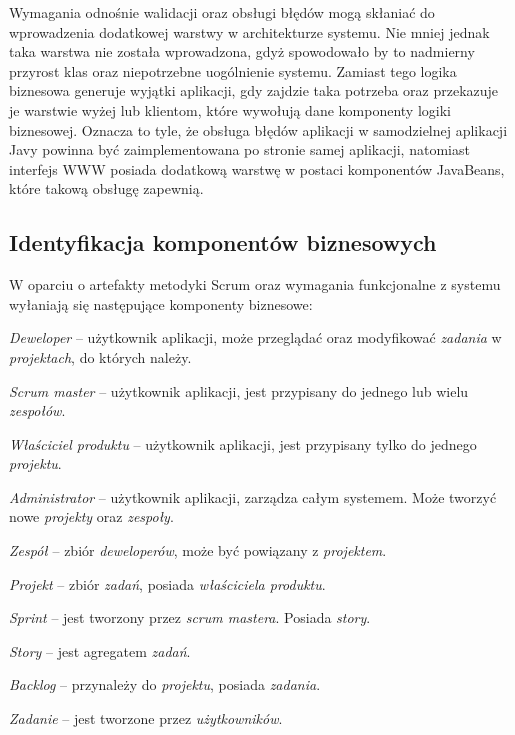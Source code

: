 Wymagania odnośnie walidacji oraz obsługi błędów mogą skłaniać do wprowadzenia dodatkowej warstwy w architekturze systemu. Nie mniej jednak taka warstwa nie została wprowadzona, gdyż spowodowało by to nadmierny przyrost klas oraz niepotrzebne uogólnienie systemu. Zamiast tego logika biznesowa generuje wyjątki aplikacji, gdy zajdzie taka potrzeba oraz przekazuje je warstwie wyżej lub klientom, które wywołują dane komponenty logiki biznesowej. Oznacza to tyle, że obsługa błędów aplikacji w samodzielnej aplikacji Javy powinna być zaimplementowana po stronie samej aplikacji, natomiast interfejs WWW posiada dodatkową warstwę w postaci komponentów JavaBeans, które takową obsługę zapewnią. 

\subsection{Identyfikacja komponentów biznesowych}
W oparciu o artefakty metodyki Scrum oraz wymagania funkcjonalne z systemu wyłaniają się następujące komponenty biznesowe:

\textit{Deweloper} -- użytkownik aplikacji, może przeglądać oraz modyfikować \textit{zadania} w \textit{projektach}, do których należy.

\textit{Scrum master} -- użytkownik aplikacji, jest przypisany do jednego lub wielu \textit{zespołów}.

\textit{Właściciel produktu} -- użytkownik aplikacji, jest przypisany tylko do jednego \textit{projektu}.

\textit{Administrator} -- użytkownik aplikacji, zarządza całym systemem. Może tworzyć nowe \textit{projekty} oraz \textit{zespoły}.

\textit{Zespół} -- zbiór \textit{deweloperów}, może być powiązany z \textit{projektem}.

\textit{Projekt} -- zbiór \textit{zadań}, posiada \textit{właściciela produktu}.

\textit{Sprint} -- jest tworzony przez  \textit{scrum mastera}. Posiada \textit{story}.

\textit{Story} -- jest agregatem \textit{zadań}.

\textit{Backlog} -- przynależy do \textit{projektu}, posiada \textit{zadania}.

\textit{Zadanie} -- jest tworzone przez \textit{użytkowników}.


